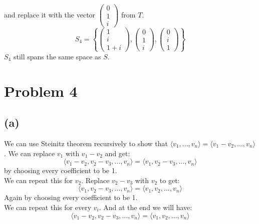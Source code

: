 \documentclass{article}
\begin{document}
\) and replace it with the vector \(
   \begin{pmatrix}
      0 \\
      1 \\
      i
   \end{pmatrix}
\) from \(T\).
\[
   S_4 = \left\{
      \begin{pmatrix}
         1 \\
         i \\
         1 + i
      \end{pmatrix},
      \begin{pmatrix}
         0 \\
         1 \\
         i
      \end{pmatrix},
      \begin{pmatrix}
         0 \\
         i \\
         1
      \end{pmatrix}
   \right\}
\]
\(S_4\) still spans the same space as \(S\).

\section*{Problem 4}
\subsection*{(a)}
We can use Steinitz theorem recursively to show that \(\langle v_1, ..., v_n\rangle = \langle v_1-v_2, ..., v_n \rangle\).
We can replace \(v_1\) with \(v_1 - v_2\) and get:
\[
   \langle v_1 - v_2, v_2 - v_3, ..., v_n \rangle = \langle v_1, v_2 -v_3, ..., v_n \rangle
\]
by choosing every coefficient to be 1. \\
We can repeat this for \(v_2\). Replace \(v_2 - v_3\) with \(v_2\) to get:
\[
   \langle v_1, v_2 -v_3, ..., v_n \rangle = \langle v_1, v_2, ..., v_n \rangle
\]
Again by choosing every coefficient to be 1. \\
We can repeat this for every \(v_i\). And at the end we will have:
\[
   \langle v_1 - v_2, v_2 - v_3, ..., v_n \rangle = \langle v_1, v_2, ..., v_n \rangle
\]
\end{document}
